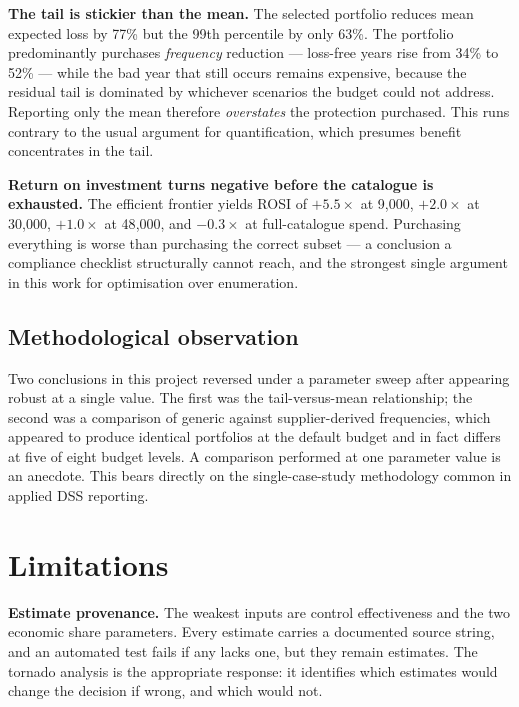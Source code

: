 \documentclass[conference]{IEEEtran}
\newcommand{\eur}{\mbox{\texteuro}}
\begin{document}
\textbf{The tail is stickier than the mean.} The selected portfolio reduces mean
expected loss by 77\% but the 99th percentile by only 63\%. The portfolio
predominantly purchases \emph{frequency} reduction --- loss-free years rise from 34\%
to 52\% --- while the bad year that still occurs remains expensive, because the
residual tail is dominated by whichever scenarios the budget could not address.
Reporting only the mean therefore \emph{overstates} the protection purchased. This
runs contrary to the usual argument for quantification, which presumes benefit
concentrates in the tail.

\textbf{Return on investment turns negative before the catalogue is exhausted.} The
efficient frontier yields ROSI of $+5.5\times$ at \eur{}9{,}000, $+2.0\times$ at
\eur{}30{,}000, $+1.0\times$ at \eur{}48{,}000, and $-0.3\times$ at full-catalogue
spend. Purchasing everything is worse than purchasing the correct subset --- a
conclusion a compliance checklist structurally cannot reach, and the strongest
single argument in this work for optimisation over enumeration.

\subsection{Methodological observation}

Two conclusions in this project reversed under a parameter sweep after appearing
robust at a single value. The first was the tail-versus-mean relationship; the
second was a comparison of generic against supplier-derived frequencies, which
appeared to produce identical portfolios at the default budget and in fact differs
at five of eight budget levels. A comparison performed at one parameter value is an
anecdote. This bears directly on the single-case-study methodology common in
applied DSS reporting.

\section{Limitations}

\textbf{Estimate provenance.} The weakest inputs are control effectiveness and the
two economic share parameters. Every estimate carries a documented source string,
and an automated test fails if any lacks one, but they remain estimates. The
tornado analysis is the appropriate response: it identifies which estimates would
change the decision if wrong, and which would not.
\end{document}
